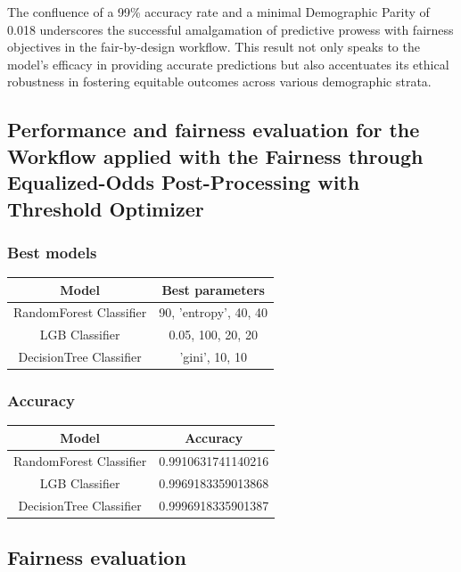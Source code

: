 \documentclass[12pt,a4paper,openright,twoside]{book}
\begin{document}
The confluence of a 99\% accuracy rate and a minimal Demographic Parity of 0.018 underscores the successful amalgamation of predictive prowess with fairness objectives in the fair-by-design workflow. This result not only speaks to the model's efficacy in providing accurate predictions but also accentuates its ethical robustness in fostering equitable outcomes across various demographic strata.


\subsection{Performance and fairness evaluation for the Workflow applied with the Fairness through Equalized-Odds Post-Processing with Threshold Optimizer}

\subsubsection{Best models}

\begin{tabular}{|c|c|}
    \hline
    \textbf{Model} & \textbf{Best parameters} \\
    \hline
    RandomForest Classifier  &  {90, 'entropy', 40, 40} \\
    \hline
    LGB Classifier & {0.05, 100, 20, 20} \\
    \hline
    DecisionTree Classifier & {'gini', 10, 10} \\
    \hline
\end{tabular}

\subsubsection{Accuracy}

\begin{tabular}{|c|c|}
    \hline
    \textbf{Model} & \textbf{Accuracy} \\ 
    \hline
    RandomForest Classifier  &  0.9910631741140216 \\
    \hline
    LGB Classifier & 0.9969183359013868 \\
    \hline
    DecisionTree Classifier & 0.9996918335901387 \\ 
    \hline
\end{tabular}

\subsection{Fairness evaluation}
\end{document}
